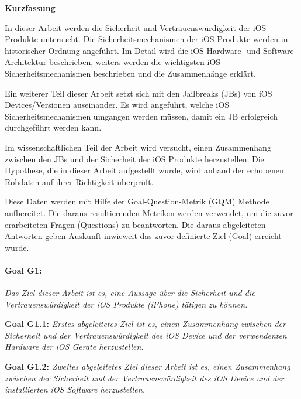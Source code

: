 %
%
% 
% 
% 



\cleardoublepage

\begin{center}
{\Large\bfseries Kurzfassung}
\end{center}
In dieser Arbeit werden die Sicherheit und Vertrauenswürdigkeit der iOS Produkte untersucht. Die Sicherheitsmechanismen der iOS Produkte werden in historischer Ordnung angeführt. Im Detail wird die iOS Hardware- und Software-Architektur beschrieben, weiters werden die wichtigsten iOS Sicherheitsmechanismen beschrieben und die Zusammenhänge erklärt. \par 
Ein weiterer Teil dieser Arbeit setzt sich mit den Jailbreaks (JBs) von iOS Devices/Versionen auseinander. Es wird angeführt, welche iOS Sicherheitsmechanismen umgangen werden müssen, damit ein JB erfolgreich durchgeführt werden kann. \par 
Im wissenschaftlichen Teil der Arbeit wird versucht, einen Zusammenhang zwischen den JBs und der Sicherheit der iOS Produkte herzustellen. Die Hypothese, die in dieser Arbeit aufgestellt wurde, wird anhand der erhobenen Rohdaten auf ihrer Richtigkeit überprüft. \par
Diese Daten werden mit Hilfe der Goal-Question-Metrik (GQM) Methode aufbereitet. Die daraus resultierenden Metriken werden verwendet, um die zuvor erarbeiteten Fragen (Questions) zu beantworten. Die daraus abgeleiteten Antworten geben Auskunft inwieweit das zuvor definierte Ziel (Goal) erreicht wurde.\par 

\paragraph{Goal G1:}\textit{\glqq Das Ziel dieser Arbeit ist es, eine Aussage über die Sicherheit und die Vertrauenswürdigkeit der iOS Produkte (iPhone) tätigen zu können.\grqq{}} \par
\textbf{Goal G1.1:} \textit{\glqq Erstes abgeleitetes Ziel ist es, einen Zusammenhang zwischen der Sicherheit und der Vertrauenswürdigkeit des iOS Device und der verwendenten Hardware der iOS Geräte herzustellen.\grqq{}} \par 
\textbf{Goal G1.2:} \textit{\glqq Zweites abgeleitetes Ziel dieser Arbeit ist es, einen Zusammenhang zwischen der Sicherheit und der Vertrauenswürdigkeit des iOS Device und der installierten iOS Software herzustellen.\grqq{}}


